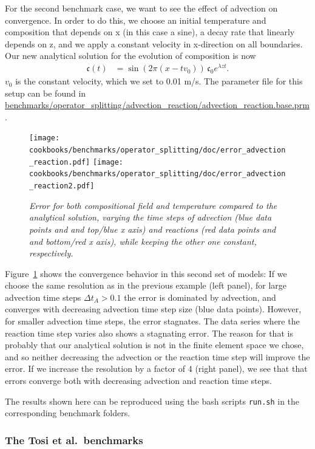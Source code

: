 \documentclass{article}
\begin{document}
For the second benchmark case, we want to see the effect of advection on convergence.
In order to do this, we choose an initial temperature and composition that depends on x (in this case a sine), a decay rate that linearly depends on z, and we apply a constant velocity in x-direction on all boundaries. Our new analytical solution for the evolution of composition is now
 \begin{align}
  \mathfrak{c}(t)
  &=
  \sin (2\pi(x-t v_0)) \, \mathfrak{c}_0 e^{\lambda z t}.
\end{align}
$v_0$ is the constant velocity, which we set to 0.01 m/s.
The parameter file for this setup can be found in \url{benchmarks/operator_splitting/advection_reaction/advection_reaction.base.prm}.
\begin{figure}
  \begin{center}
    \texttt{[image: cookbooks/benchmarks/operator\_splitting/doc/error\_advection\_reaction.pdf]}
    \texttt{[image: cookbooks/benchmarks/operator\_splitting/doc/error\_advection\_reaction2.pdf]}
  \end{center}
  \caption{\it Error for both compositional field and temperature compared to the analytical solution, varying the time steps of advection (blue data points and and top/blue x axis) and reactions (red data points and and bottom/red x axis), while keeping the other one constant, respectively.}
  \label{fig:advection-reaction}
\end{figure}
Figure~\ref{fig:advection-reaction} shows the convergence behavior in this second set of models:
If we choose the same resolution as in the previous example (left panel), for large advection time steps $\Delta t_A > 0.1$ the error is dominated by advection, and converges with decreasing advection time step size (blue data points). However, for smaller advection time steps, the error stagnates. The data series where the reaction time step varies also shows a stagnating error. The reason for that is probably that our analytical solution is not in the finite element space we chose, and so neither decreasing the advection or the reaction time step will improve the error.
If we increase the resolution by a factor of 4 (right panel), we see that that errors converge both with decreasing advection and reaction time steps.

The results shown here can be reproduced using the bash scripts \texttt{run.sh} in the corresponding benchmark folders.

\subsubsection{The Tosi et al.~benchmarks}
\label{sec:benchmark-tosii}
\end{document}
